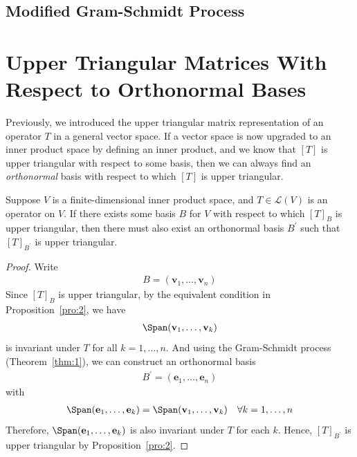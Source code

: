 \documentclass[thmcnt=section, color=blue, 12pt]{my-elegantbook}
\begin{document}

\subsection{Modified Gram-Schmidt Process}


\section{Upper Triangular Matrices With Respect to Orthonormal Bases} \label{sec:2}

Previously, we introduced the upper triangular matrix representation of an operator $T$ in a general vector space. If a vector space is now upgraded to an inner product space by defining an inner product, and we know that $[T]$ is upper triangular with respect to some basis, then we can always find an \textit{orthonormal} basis with respect to which $[T]$ is upper triangular.

\begin{theorem} \label{thm:11}
    Suppose $V$ is a finite-dimensional inner product space, and $T \in \mathcal{L}(V)$ is an operator on $V$. If there exists some basis $B$ for $V$ with respect to which $[T]_B$ is upper triangular, then there must also exist an orthonormal basis $B^\prime$ such that $[T]_{B^\prime}$ is upper triangular.
\end{theorem}

\begin{proof}
    Write
    \begin{align*}
        B = (\mathbf{v}_1, \ldots, \mathbf{v}_n)
    \end{align*}
    Since $[T]_B$ is upper triangular, by the equivalent condition in Proposition~\ref{pro:2}, we have 
    \begin{align*}
        \Span (\mathbf{v}_1, \ldots, \mathbf{v}_k)
    \end{align*}
    is invariant under $T$ for all $k = 1, \ldots, n$. And using the Gram-Schmidt process (Theorem~\ref{thm:1}), we can construct an orthonormal basis 
    \begin{align*}
        B^\prime = (\mathbf{e}_1, \ldots, \mathbf{e}_n)
    \end{align*}
    with 
    \begin{align*}
        \Span (\mathbf{e}_1, \ldots, \mathbf{e}_k)
        = \Span (\mathbf{v}_1, \ldots, \mathbf{v}_k)
        \quad \forall k = 1, \ldots, n
    \end{align*}
    Therefore, $\Span (\mathbf{e}_1, \ldots, \mathbf{e}_k)$ is also invariant under $T$ for each $k$. Hence, $[T]_{B^\prime}$ is upper triangular by Proposition~\ref{pro:2}.
\end{proof}
\end{document}
